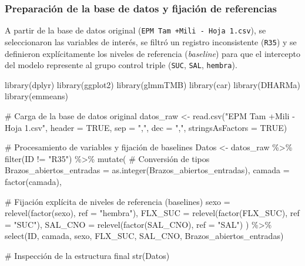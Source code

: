 \documentclass[
  letterpaper,
  DIV=11,
  numbers=noendperiod]{scrartcl}
\newenvironment{Shaded}{\begin{snugshade}}{\end{snugshade}}
\newcommand{\AttributeTok}[1]{\textcolor[rgb]{0.40,0.45,0.13}{#1}}
\newcommand{\CommentTok}[1]{\textcolor[rgb]{0.37,0.37,0.37}{#1}}
\newcommand{\ConstantTok}[1]{\textcolor[rgb]{0.56,0.35,0.01}{#1}}
\newcommand{\FunctionTok}[1]{\textcolor[rgb]{0.28,0.35,0.67}{#1}}
\newcommand{\NormalTok}[1]{\textcolor[rgb]{0.00,0.23,0.31}{#1}}
\newcommand{\OtherTok}[1]{\textcolor[rgb]{0.00,0.23,0.31}{#1}}
\newcommand{\SpecialCharTok}[1]{\textcolor[rgb]{0.37,0.37,0.37}{#1}}
\newcommand{\StringTok}[1]{\textcolor[rgb]{0.13,0.47,0.30}{#1}}
\begin{document}
\subsubsection{\texorpdfstring{\textbf{Preparación de la base de datos y
fijación de
referencias}}{Preparación de la base de datos y fijación de referencias}}\label{preparaciuxf3n-de-la-base-de-datos-y-fijaciuxf3n-de-referencias}

A partir de la base de datos original
(\texttt{EPM\ Tam\ +Mili\ -\ Hoja\ 1.csv}), se seleccionaron las
variables de interés, se filtró un registro inconsistente (\texttt{R35})
y se definieron explícitamente los niveles de referencia
(\emph{baseline}) para que el intercepto del modelo represente al grupo
control triple (\texttt{SUC}, \texttt{SAL}, \texttt{hembra}).

\begin{Shaded}
\begin{Highlighting}[]
\FunctionTok{library}\NormalTok{(dplyr)}
\FunctionTok{library}\NormalTok{(ggplot2)}
\FunctionTok{library}\NormalTok{(glmmTMB)}
\FunctionTok{library}\NormalTok{(car)}
\FunctionTok{library}\NormalTok{(DHARMa)}
\FunctionTok{library}\NormalTok{(emmeans)}

\CommentTok{\# Carga de la base de datos original}
\NormalTok{datos\_raw }\OtherTok{\textless{}{-}} \FunctionTok{read.csv}\NormalTok{(}\StringTok{"EPM Tam +Mili {-} Hoja 1.csv"}\NormalTok{, }\AttributeTok{header =} \ConstantTok{TRUE}\NormalTok{, }\AttributeTok{sep =} \StringTok{","}\NormalTok{, }\AttributeTok{dec =} \StringTok{","}\NormalTok{, }\AttributeTok{stringsAsFactors =} \ConstantTok{TRUE}\NormalTok{)}

\CommentTok{\# Procesamiento de variables y fijación de baselines}
\NormalTok{Datos }\OtherTok{\textless{}{-}}\NormalTok{ datos\_raw }\SpecialCharTok{\%\textgreater{}\%}
  \FunctionTok{filter}\NormalTok{(ID }\SpecialCharTok{!=} \StringTok{"R35"}\NormalTok{) }\SpecialCharTok{\%\textgreater{}\%}
  \FunctionTok{mutate}\NormalTok{(}
    \CommentTok{\# Conversión de tipos}
    \AttributeTok{Brazos\_abiertos\_entradas =} \FunctionTok{as.integer}\NormalTok{(Brazos\_abiertos\_entradas),}
    \AttributeTok{camada =} \FunctionTok{factor}\NormalTok{(camada),}
    
    \CommentTok{\# Fijación explícita de niveles de referencia (baselines)}
    \AttributeTok{sexo =} \FunctionTok{relevel}\NormalTok{(}\FunctionTok{factor}\NormalTok{(sexo), }\AttributeTok{ref =} \StringTok{"hembra"}\NormalTok{),}
    \AttributeTok{FLX\_SUC =} \FunctionTok{relevel}\NormalTok{(}\FunctionTok{factor}\NormalTok{(FLX\_SUC), }\AttributeTok{ref =} \StringTok{"SUC"}\NormalTok{),}
    \AttributeTok{SAL\_CNO =} \FunctionTok{relevel}\NormalTok{(}\FunctionTok{factor}\NormalTok{(SAL\_CNO), }\AttributeTok{ref =} \StringTok{"SAL"}\NormalTok{)}
\NormalTok{  ) }\SpecialCharTok{\%\textgreater{}\%}
  \FunctionTok{select}\NormalTok{(ID, camada, sexo, FLX\_SUC, SAL\_CNO, Brazos\_abiertos\_entradas)}

\CommentTok{\# Inspección de la estructura final}
\FunctionTok{str}\NormalTok{(Datos)}
\end{Highlighting}
\end{Shaded}
\end{document}
